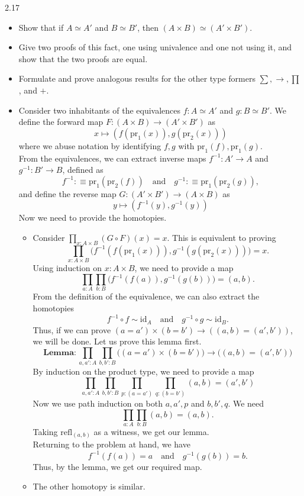 \documentclass[14pt]{extarticle}
\newcommand{\0}{{\mathbf 0}}
\newcommand{\1}{{\mathbf 1}}
\newcommand{\2}{{\mathbf 2}}
\newcommand{\mt}{\mapsto}
\newcommand{\refl}{\mathrm{refl}}
\newcommand{\pr}{\mathrm{pr}}
\newcommand{\id}{\mathrm{id}}
\begin{document}
\begin{prob}{2.17}{}

\begin{itemize}
\item [(i)] Show that if $A \simeq A'$ and $B \simeq B'$, then $(A \times B) \simeq (A' \times B')$.
\item [(ii)] Give two proofs of this fact, one using univalence and one not using it, and show that the two proofs are equal.
\item [(iii)] Formulate and prove analogous results for the other type formers $\sum, \to, \prod$, and $+$.
\end{itemize}
\end{prob}

\begin{itemize}
\item [(i)] Consider two inhabitants of the equivalences $f : A \simeq A'$ and $g : B \simeq B'$. We define the forward map $F : (A \times B) \to (A' \times B')$ as
\[x \mt (f(\pr_1(x)), g(\pr_2(x)))\] where we abuse notation by identifying $f,g$ with $\pr_1(f),\pr_1(g)$.\\
From the equivalences, we can extract inverse maps $f^{-1} : A' \to A$ and $g^{-1} : B' \to B$, defined as \[f^{-1} :\equiv \pr_1(\pr_2(f)) \quad \text{and} \quad g^{-1} :\equiv \pr_1(\pr_2(g)),\] and define the reverse map $G : (A' \times B') \to (A \times B)$ as
\[y \mt (f^{-1}(y), g^{-1}(y))\]
Now we need to provide the homotopies.

\begin{itemize}
\item Consider $\prod_{x:A\times B} (G \circ F)(x) = x$. This is equivalent to proving
\[\prod_{x:A\times B} \Big(f^{-1}(f(\pr_1(x))), g^{-1}(g(\pr_2(x)))\Big) = x.\] Using induction on $x : A \times B$, we need to provide a map
\[\prod_{a:A}\prod_{b:B}\Big(f^{-1}(f(a)), g^{-1}(g(b))\Big) = (a,b).\] From the definition of the equivalence, we can also extract the homotopies
\[f^{-1} \circ f \sim \id_{A} \quad \text{and} \quad g^{-1} \circ g \sim \id_{B}.\] Thus, if we can prove $(a = a') \times (b = b') \to ((a,b) = (a',b'))$, we will be done. Let us prove this lemma first.
\[\textbf{Lemma}: \prod_{a,a' : A}\prod_{b,b' : B}\Big((a = a') \times (b = b')\Big) \to \Big((a,b) = (a',b')\Big)\]
By induction on the product type, we need to provide a map
\[\prod_{a,a' : A}\prod_{b,b' : B}\prod_{p : (a = a')} \prod_{q :(b = b')} (a,b) = (a',b')\]
Now we use path induction on both $a,a',p$ and $b,b',q$. We need 
\[\prod_{a:A}\prod_{b : B}(a,b) = (a,b).\] Taking $\refl_{(a,b)}$ as a witness, we get our lemma.\\
Returning to the problem at hand, we have \[f^{-1}(f(a)) = a \quad \text{and} \quad g^{-1}(g(b)) = b.\] Thus, by the lemma, we get our required map.
\item The other homotopy is similar.
\end{itemize}


\end{itemize}
\end{document}

